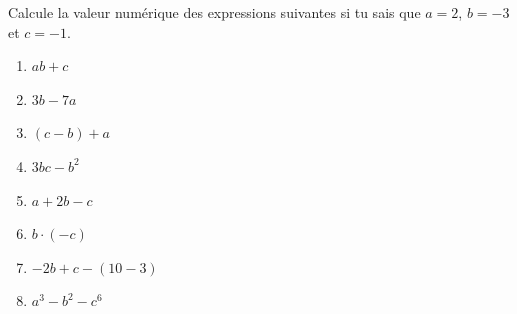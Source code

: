 %
%
    Calcule la valeur numérique des expressions suivantes si tu sais que
    \(a = 2\), \(b = - 3\) et \(c = - 1\).
    \begin{enumerate}[cols=3, itemsep=.4cm]
        \item \(ab + c\)
        \item \(3b - 7a\)
        \item \((c - b) + a\)
        \item \(3bc - b^{2}\)
        \item \(a + 2b - c\)
        \item \(b \cdot ( - c)\)
        \item \(-2b+c-(10-3)\)
        \item \(a^3 - b^2 - c^6\)
    \end{enumerate}
